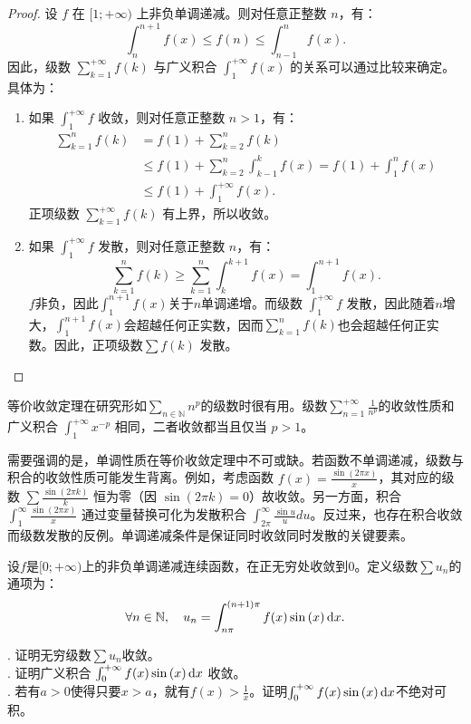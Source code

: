 \documentclass[12pt,UTF8,fontset=none]{ctexbook}
\begin{document}
\begin{proof}
    设 $f$ 在 $[1;+\infty)$ 上非负单调递减。则对任意正整数 $n$，有：
    \[
    \int_{n}^{n+1} f(x) \leqslant f(n) \leqslant \int_{n-1}^{n} f(x).
    \]
    因此，级数 $\sum_{k=1}^{+\infty} f(k)$ 与广义积合 $\int_{1}^{+\infty} f(x)$ 的关系可以通过比较来确定。具体为：
    \begin{enumerate}
        \item 如果 $\int_{1}^{+\infty} f$ 收敛，则对任意正整数 $n>1$，有：
        \begin{align*}
            \sum_{k=1}^{n} f(k) &= f(1) + \sum_{k=2}^{n} f(k)  \\
            &\leqslant  f(1) +\sum_{k=2}^{n} \int_{k-1}^{k} f(x) =  f(1) +\int_{1}^{n} f(x) \\
            &\leqslant  f(1) +\int_{1}^{+\infty} f(x).
        \end{align*}
        正项级数 $\sum_{k=1}^{+\infty} f(k)$ 有上界，所以收敛。

        \item 如果 $\int_{1}^{+\infty} f$ 发散，则对任意正整数 $n$，有：
        \[
        \sum_{k=1}^{n} f(k) \geqslant \sum_{k=1}^{n} \int_{k}^{k+1} f(x) = \int_{1}^{n+1} f(x) .
        \]
        $f$非负，因此$\int_{1}^{n+1} f(x) $关于$n$单调递增。而级数 $\int_{1}^{+\infty} f$ 发散，因此随着$n$增大，$\int_{1}^{n+1} f(x) $会超越任何正实数，因而$\sum_{k=1}^{n} f(k)$也会超越任何正实数。因此，正项级数$\sum f(k)$ 发散。
    \end{enumerate}
\end{proof}

等价收敛定理在研究形如$\displaystyle\sum_{n\in\mathbb{N}}n^p$的级数时很有用。级数$\displaystyle\sum_{n=1}^{+\infty} \frac{1}{n^{p}}$的收敛性质和广义积合 $\int_1^{+\infty} x^{-p} $ 相同，二者收敛都当且仅当 $p>1$。

需要强调的是，单调性质在等价收敛定理中不可或缺。若函数不单调递减，级数与积合的收敛性质可能发生背离。例如，考虑函数 $f(x) = \frac{\sin(2\pi x)}{x}$，其对应的级数 $\sum \frac{\sin(2\pi k)}{k}$ 恒为零（因 $\sin(2\pi k)=0$）故收敛。另一方面，积合 $\int_1^\infty \frac{\sin(2\pi x)}{x}$ 通过变量替换可化为发散积合 $\int_{2\pi}^\infty \frac{\sin u}{u}  du$。反过来，也存在积合收敛而级数发散的反例。单调递减条件是保证同时收敛同时发散的关键要素。

\begin{et}
    设$f$是$[0;+\infty)$上的非负单调递减连续函数，在正无穷处收敛到$0$。定义级数$\sum u_n$的通项为：
    $$ \forall n\in \mathbb{N}, \quad u_n = \int_{n\pi}^{(n+1)\pi} f(x) \sin{(x)} \,\mathrm{d}x. $$
    
    . 证明无穷级数$\sum u_n$收敛。\\
    . 证明广义积合 $\int_0^{+\infty} f(x) \sin{(x)} \,\mathrm{d}x$ 收敛。\\
    . 若有$a>0$使得只要$x > a$，就有$\displaystyle f(x) > \frac{1}{x}$。证明$\int_0^{+\infty} f(x) \sin{(x)} \,\mathrm{d}x$不绝对可积。
\end{et}
\end{document}
